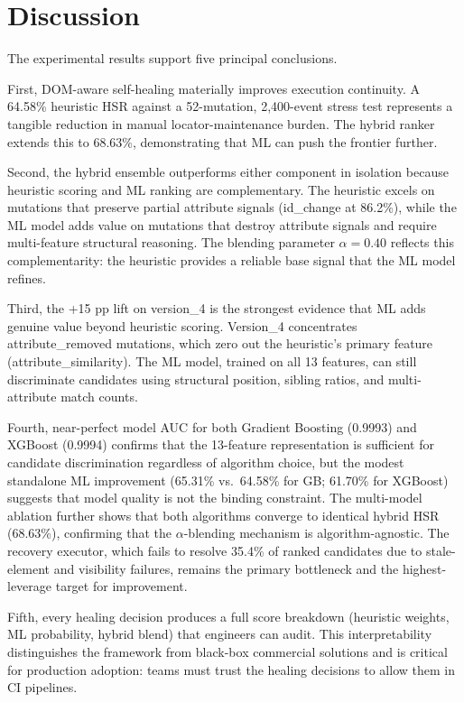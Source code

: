 \documentclass[12pt]{article}
\begin{document}
\section{Discussion}
\label{sec:discussion}

The experimental results support five principal conclusions.

First, DOM-aware self-healing materially improves execution continuity. A 64.58\% heuristic HSR against a 52-mutation, 2,400-event stress test represents a tangible reduction in manual locator-maintenance burden. The hybrid ranker extends this to 68.63\%, demonstrating that ML can push the frontier further.

Second, the hybrid ensemble outperforms either component in isolation because heuristic scoring and ML ranking are complementary. The heuristic excels on mutations that preserve partial attribute signals (id\_change at 86.2\%), while the ML model adds value on mutations that destroy attribute signals and require multi-feature structural reasoning. The blending parameter $\alpha = 0.40$ reflects this complementarity: the heuristic provides a reliable base signal that the ML model refines.

Third, the +15 pp lift on version\_4 is the strongest evidence that ML adds genuine value beyond heuristic scoring. Version\_4 concentrates attribute\_removed mutations, which zero out the heuristic's primary feature (attribute\_similarity). The ML model, trained on all 13 features, can still discriminate candidates using structural position, sibling ratios, and multi-attribute match counts.

Fourth, near-perfect model AUC for both Gradient Boosting (0.9993) and XGBoost (0.9994) confirms that the 13-feature representation is sufficient for candidate discrimination regardless of algorithm choice, but the modest standalone ML improvement (65.31\% vs.\ 64.58\% for GB; 61.70\% for XGBoost) suggests that model quality is not the binding constraint. The multi-model ablation further shows that both algorithms converge to identical hybrid HSR (68.63\%), confirming that the $\alpha$-blending mechanism is algorithm-agnostic. The recovery executor, which fails to resolve 35.4\% of ranked candidates due to stale-element and visibility failures, remains the primary bottleneck and the highest-leverage target for improvement.

Fifth, every healing decision produces a full score breakdown (heuristic weights, ML probability, hybrid blend) that engineers can audit. This interpretability distinguishes the framework from black-box commercial solutions and is critical for production adoption: teams must trust the healing decisions to allow them in CI pipelines.
\end{document}
